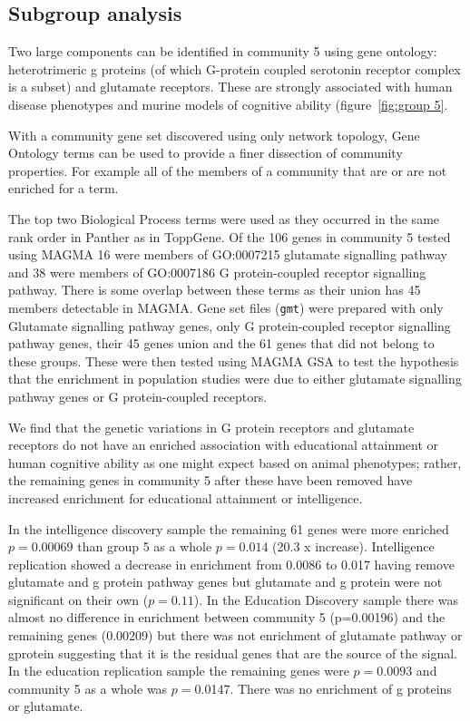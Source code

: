 \subsection{Subgroup analysis}
\label{sec:subgroup analysis}
Two large components can be identified in community 5 using gene ontology: heterotrimeric g proteins (of which G-protein coupled serotonin receptor complex is a subset) and glutamate receptors. These are strongly associated with human disease phenotypes and murine models of cognitive ability (figure~\ref{fig:group 5}.

With a community gene set discovered using only network topology, Gene Ontology terms can be used to provide a finer dissection of community properties. For example all of the members of a community that are or are not enriched for a term.

The top two Biological Process terms were used as they occurred in the same rank order in Panther as in ToppGene.
Of the 106 genes in community 5 tested using MAGMA 16 were members of GO:0007215 glutamate signalling pathway and 38 were members of GO:0007186  G protein-coupled receptor signalling pathway. There is some overlap between these terms as their union has 45 members detectable in MAGMA. Gene set files (\texttt{gmt}) were prepared with only Glutamate signalling pathway genes, only G protein-coupled receptor signalling pathway genes, their 45 genes union and the 61 genes that did not belong to these groups. These were then tested using MAGMA GSA to test the hypothesis that the enrichment in population studies were due to either glutamate signalling pathway genes or G protein-coupled receptors. 



We find that the genetic variations in G protein receptors and glutamate receptors do not have an enriched association with educational attainment or human cognitive ability as one might expect based on animal phenotypes; rather, the remaining genes in community 5 after these have been removed have increased enrichment for educational attainment or intelligence.

In the intelligence discovery sample the remaining 61 genes were more enriched $p=0.00069$ than group 5 as a whole $p=0.014$ (20.3 x increase). Intelligence replication showed a decrease in enrichment from 0.0086 to 0.017 having remove glutamate and g protein pathway genes but glutamate and g protein were not significant on their own ($p=0.11$). In the Education Discovery sample there was almost no difference in enrichment between community 5 (p=0.00196) and the remaining genes (0.00209) but there was not enrichment of glutamate pathway or gprotein suggesting that it is the residual genes that are the source of the signal. In the education replication sample the remaining genes were $p=0.0093$ and community 5 as a whole was $p=$0.0147. There was no enrichment of g proteins or glutamate. 

